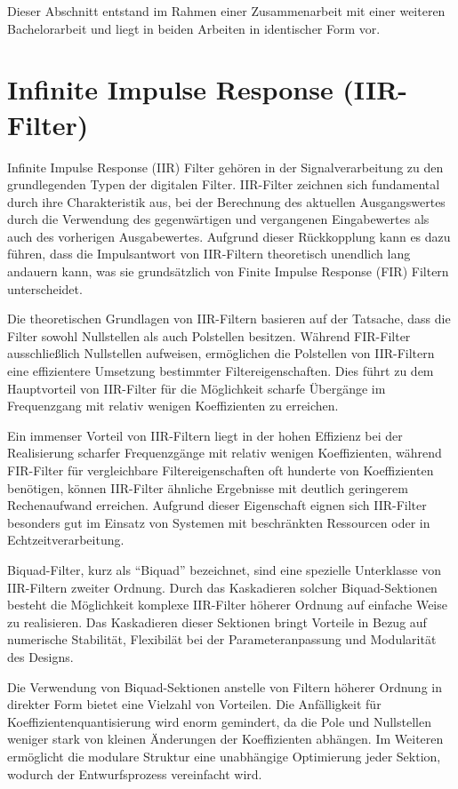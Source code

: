 \documentclass[
  ngerman,
  letterpaper,
  DIV=11]{scrreprt}
\begin{document}
Dieser Abschnitt entstand im Rahmen einer Zusammenarbeit mit einer
weiteren Bachelorarbeit und liegt in beiden Arbeiten in identischer Form
vor.

\section{Infinite Impulse Response
(IIR-Filter)}\label{infinite-impulse-response-iir-filter}

Infinite Impulse Response (IIR) Filter gehören in der Signalverarbeitung
zu den grundlegenden Typen der digitalen Filter. IIR-Filter zeichnen
sich fundamental durch ihre Charakteristik aus, bei der Berechnung des
aktuellen Ausgangswertes durch die Verwendung des gegenwärtigen und
vergangenen Eingabewertes als auch des vorherigen Ausgabewertes.
Aufgrund dieser Rückkopplung kann es dazu führen, dass die Impulsantwort
von IIR-Filtern theoretisch unendlich lang andauern kann, was sie
grundsätzlich von Finite Impulse Response (FIR) Filtern unterscheidet.

Die theoretischen Grundlagen von IIR-Filtern basieren auf der Tatsache,
dass die Filter sowohl Nullstellen als auch Polstellen besitzen. Während
FIR-Filter ausschließlich Nullstellen aufweisen, ermöglichen die
Polstellen von IIR-Filtern eine effizientere Umsetzung bestimmter
Filtereigenschaften. Dies führt zu dem Hauptvorteil von IIR-Filter für
die Möglichkeit scharfe Übergänge im Frequenzgang mit relativ wenigen
Koeffizienten zu erreichen.

Ein immenser Vorteil von IIR-Filtern liegt in der hohen Effizienz bei
der Realisierung scharfer Frequenzgänge mit relativ wenigen
Koeffizienten, während FIR-Filter für vergleichbare Filtereigenschaften
oft hunderte von Koeffizienten benötigen, können IIR-Filter ähnliche
Ergebnisse mit deutlich geringerem Rechenaufwand erreichen. Aufgrund
dieser Eigenschaft eignen sich IIR-Filter besonders gut im Einsatz von
Systemen mit beschränkten Ressourcen oder in Echtzeitverarbeitung.

Biquad-Filter, kurz als ``Biquad'' bezeichnet, sind eine spezielle
Unterklasse von IIR-Filtern zweiter Ordnung. Durch das Kaskadieren
solcher Biquad-Sektionen besteht die Möglichkeit komplexe IIR-Filter
höherer Ordnung auf einfache Weise zu realisieren. Das Kaskadieren
dieser Sektionen bringt Vorteile in Bezug auf numerische Stabilität,
Flexibilät bei der Parameteranpassung und Modularität des Designs.

Die Verwendung von Biquad-Sektionen anstelle von Filtern höherer Ordnung
in direkter Form bietet eine Vielzahl von Vorteilen. Die Anfälligkeit
für Koeffizientenquantisierung wird enorm gemindert, da die Pole und
Nullstellen weniger stark von kleinen Änderungen der Koeffizienten
abhängen. Im Weiteren ermöglicht die modulare Struktur eine unabhängige
Optimierung jeder Sektion, wodurch der Entwurfsprozess vereinfacht wird.
\end{document}
